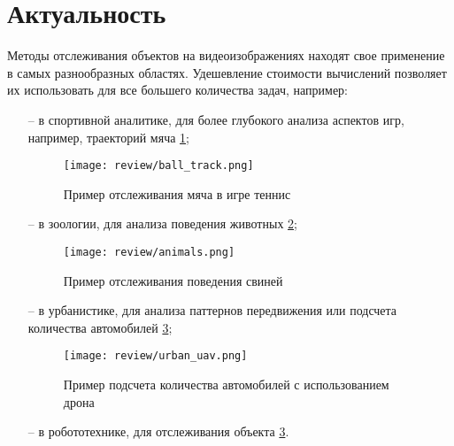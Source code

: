 \section{Актуальность}
Методы отслеживания объектов на видеоизображениях находят свое применение в самых разнообразных областях. 
Удешевление стоимости вычислений позволяет их использовать для все большего количества задач, например:
\begin{itemize}
    \item[--] в спортивной аналитике, для более глубокого анализа аспектов игр, например, траекторий мяча \ref{fig:ball_track};
    \begin{figure}[ht]
        \centering
        \texttt{[image: review/ball\_track.png]}
        \caption{Пример отслеживания мяча в игре теннис \cite[страница 30, рисунок 16]{naik2022comprehensive}}
        \label{fig:ball_track}
    \end{figure}
    \FloatBarrier
    \item[--] в зоологии, для анализа поведения животных \ref{fig:animals}; 
    \begin{figure}[ht]
        \centering
        \texttt{[image: review/animals.png]}
        \caption{Пример отслеживания поведения свиней \cite[страница 12, рисунок 7]{tu2024behavior}}
        \label{fig:animals}
    \end{figure}
    \FloatBarrier
    \item[--] в урбанистике, для анализа паттернов передвижения или подсчета количества автомобилей \ref{fig:urban};
    \begin{figure}[ht]
        \centering
        \texttt{[image: review/urban\_uav.png]}
        \caption{Пример подсчета количества автомобилей с использованием дрона \cite[страница 16, рисунок 8]{wu2024multi}}
        \label{fig:urban}
    \end{figure}
    \FloatBarrier
    \item[--] в робототехнике, для отслеживания объекта \ref{fig:urban}. 

\end{itemize}

